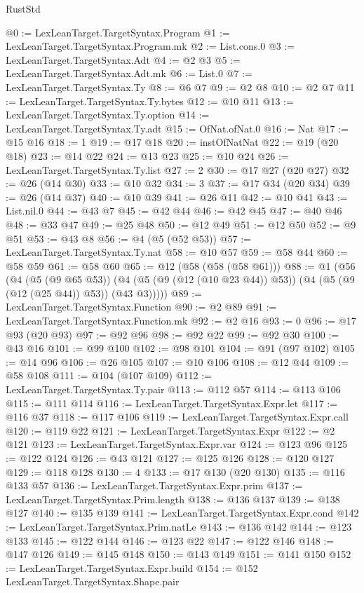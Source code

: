 \begin{lexlean}{RustStd}
\begin{coremodule}
@0 := LexLeanTarget.TargetSyntax.Program
@1 := LexLeanTarget.TargetSyntax.Program.mk
@2 := List.cons.{0}
@3 := LexLeanTarget.TargetSyntax.Adt
@4 := @2 @3
@5 := LexLeanTarget.TargetSyntax.Adt.mk
@6 := List.{0}
@7 := LexLeanTarget.TargetSyntax.Ty
@8 := @6 @7
@9 := @2 @8
@10 := @2 @7
@11 := LexLeanTarget.TargetSyntax.Ty.bytes
@12 := @10 @11
@13 := LexLeanTarget.TargetSyntax.Ty.option
@14 := LexLeanTarget.TargetSyntax.Ty.adt
@15 := OfNat.ofNat.{0}
@16 := Nat
@17 := @15 @16
@18 := 1
@19 := @17 @18
@20 := instOfNatNat
@22 := @19 (@20 @18)
@23 := @14 @22
@24 := @13 @23
@25 := @10 @24
@26 := LexLeanTarget.TargetSyntax.Ty.list
@27 := 2
@30 := @17 @27 (@20 @27)
@32 := @26 (@14 @30)
@33 := @10 @32
@34 := 3
@37 := @17 @34 (@20 @34)
@39 := @26 (@14 @37)
@40 := @10 @39
@41 := @26 @11
@42 := @10 @41
@43 := List.nil.{0}
@44 := @43 @7
@45 := @42 @44
@46 := @42 @45
@47 := @40 @46
@48 := @33 @47
@49 := @25 @48
@50 := @12 @49
@51 := @12 @50
@52 := @9 @51
@53 := @43 @8
@56 := @4 (@5 (@52 @53))
@57 := LexLeanTarget.TargetSyntax.Ty.nat
@58 := @10 @57
@59 := @58 @44
@60 := @58 @59
@61 := @58 @60
@65 := @12 (@58 (@58 (@58 @61)))
@88 := @1
    (@56
      (@4
        (@5 (@9 @65 @53))
        (@4 (@5 (@9 (@12 (@10 @23 @44)) @53)) (@4 (@5 (@9 (@12 (@25 @44)) @53)) (@43 @3)))))
@89 := LexLeanTarget.TargetSyntax.Function
@90 := @2 @89
@91 := LexLeanTarget.TargetSyntax.Function.mk
@92 := @2 @16
@93 := 0
@96 := @17 @93 (@20 @93)
@97 := @92 @96
@98 := @92 @22
@99 := @92 @30
@100 := @43 @16
@101 := @99 @100
@102 := @98 @101
@104 := @91 (@97 @102)
@105 := @14 @96
@106 := @26 @105
@107 := @10 @106
@108 := @12 @44
@109 := @58 @108
@111 := @104 (@107 @109)
@112 := LexLeanTarget.TargetSyntax.Ty.pair
@113 := @112 @57
@114 := @113 @106
@115 := @111 @114
@116 := LexLeanTarget.TargetSyntax.Expr.let
@117 := @116 @37
@118 := @117 @106
@119 := LexLeanTarget.TargetSyntax.Expr.call
@120 := @119 @22
@121 := LexLeanTarget.TargetSyntax.Expr
@122 := @2 @121
@123 := LexLeanTarget.TargetSyntax.Expr.var
@124 := @123 @96
@125 := @122 @124
@126 := @43 @121
@127 := @125 @126
@128 := @120 @127
@129 := @118 @128
@130 := 4
@133 := @17 @130 (@20 @130)
@135 := @116 @133 @57
@136 := LexLeanTarget.TargetSyntax.Expr.prim
@137 := LexLeanTarget.TargetSyntax.Prim.length
@138 := @136 @137
@139 := @138 @127
@140 := @135 @139
@141 := LexLeanTarget.TargetSyntax.Expr.cond
@142 := LexLeanTarget.TargetSyntax.Prim.natLe
@143 := @136 @142
@144 := @123 @133
@145 := @122 @144
@146 := @123 @22
@147 := @122 @146
@148 := @147 @126
@149 := @145 @148
@150 := @143 @149
@151 := @141 @150
@152 := LexLeanTarget.TargetSyntax.Expr.build
@154 := @152 LexLeanTarget.TargetSyntax.Shape.pair

\end{coremodule}
\end{lexlean}
